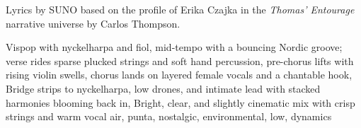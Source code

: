 
\begin{notes}
Lyrics by SUNO based on the profile of Erika Czajka in the \emph{Thomas’ Entourage} narrative universe by Carlos Thompson.
\end{notes}
\begin{style}
Vispop with nyckelharpa and fiol, mid-tempo with a bouncing Nordic groove; verse rides sparse plucked strings and soft hand percussion, pre-chorus lifts with rising violin swells, chorus lands on layered female vocals and a chantable hook, Bridge strips to nyckelharpa, low drones, and intimate lead with stacked harmonies blooming back in, Bright, clear, and slightly cinematic mix with crisp strings and warm vocal air, punta, nostalgic, environmental, low, dynamics
\end{style}
